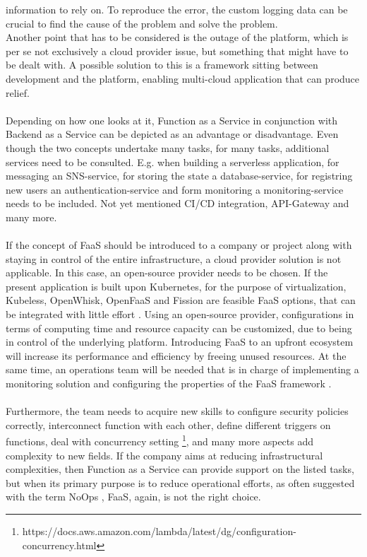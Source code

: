 \documentclass[a4paper,twoside,11pt, pagesize]{scrartcl}
\begin{document}
information to rely on. To reproduce the error, the custom logging data can be crucial to find the cause of the problem and solve the problem.\\Another point that has to be considered is the outage of the platform, which is per se not exclusively a cloud provider issue, but something that might have to be dealt with. A possible solution to this is a framework sitting between development and the platform, enabling multi-cloud application that can produce relief.\\\\ Depending on how one looks at it, Function as a Service in conjunction with Backend as a Service can be depicted as an advantage or disadvantage. Even though the two concepts undertake many tasks, for many tasks, additional services need to be consulted. E.g. when building a serverless application, for messaging an SNS-service, for storing the state a database-service, for registring new users an authentication-service and form monitoring a monitoring-service needs to be included. Not yet mentioned CI/CD integration, API-Gateway and many more.\\\\ If the concept of FaaS should be introduced to a company or project along with staying in control of the entire infrastructure, a cloud provider solution is not applicable. In this case, an open-source provider needs to be chosen. If the present application is built upon Kubernetes, for the purpose of virtualization, Kubeless, OpenWhisk, OpenFaaS and Fission are feasible FaaS options, that can be integrated with little effort \cite{palade2019evaluation}. Using an open-source provider, configurations in terms of computing time and resource capacity can be customized, due to being in control of the underlying platform. Introducing FaaS to an upfront ecosystem will increase its performance and efficiency by freeing unused resources. At the same time, an operations team will be needed that is in charge of implementing a monitoring solution and configuring the properties of the FaaS framework \cite{mohanty2018evaluation}.\\\\ Furthermore, the team needs to acquire new skills to configure security policies correctly, interconnect function with each other, define different triggers on functions, deal with concurrency setting \footnote{https://docs.aws.amazon.com/lambda/latest/dg/configuration-concurrency.html}, and many more aspects add complexity to new fields. If the company aims at reducing infrastructural complexities, then Function as a Service can provide support on the listed tasks, but when its primary purpose is to reduce operational efforts, as often suggested with the term \glqq NoOps\grqq{} \cite{eivy2017wary}, FaaS, again, is not the right choice.
\end{document}
